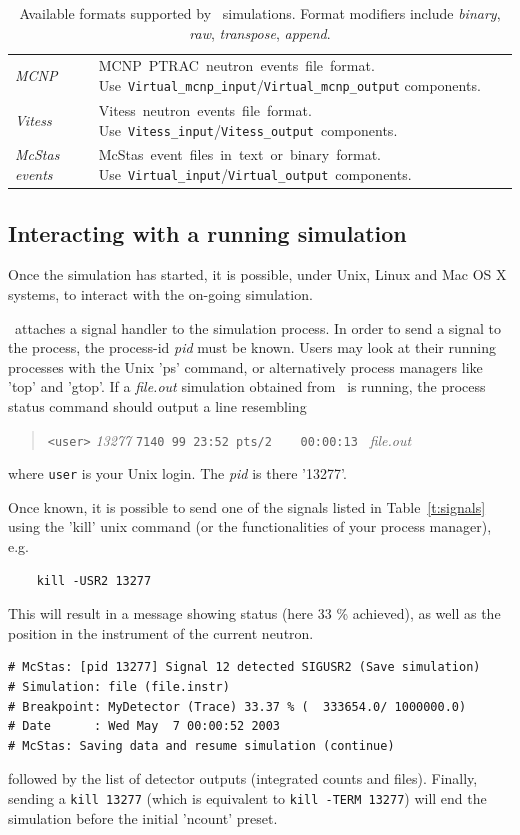 \begin{table}
\begin{center}
{\begin{tabular}{|p{}|c|p{}|}
      {\it MCNP} &  & \hbox{MCNP PTRAC neutron events file format.} \hbox{Use
        \verb+Virtual_mcnp_input+/\verb+Virtual_mcnp_output+} components. \index{MCNP}\\
      {\it Vitess} &  & \hbox{Vitess neutron events file format.} \hbox{Use \verb+Vitess_input+/\verb+Vitess_output+ components. } \index{Vitess}\\
      {\it McStas events} & & \hbox{McStas event files in text or binary
      format.} \hbox{Use \verb+Virtual_input+/\verb+Virtual_output+ components.} \\
      \hline
    \end{tabular}
    \caption{Available formats supported by \MCS\ simulations. Format modifiers include \emph{binary}, \emph{raw}, \emph{transpose}, \emph{append}.}
    \label{t:formatoptions}
    }
  \end{center}
\end{table}

\subsection{Interacting with a running simulation}

Once the simulation has started, it is possible, under Unix, Linux and Mac OS X systems, to interact with the on-going simulation.

\MCS\ attaches a signal handler to the simulation process. In order to send a signal to the process, the process-id {\it pid} must be known. Users may look at their running processes with the Unix 'ps' command, or alternatively process managers like 'top' and 'gtop'.
If a {\it file.out} simulation obtained from \MCS\ is running, the process status command should output a line resembling
\begin{quote}
  \verb|<user>| {\it 13277} \verb|7140 99 23:52 pts/2    00:00:13 | {\it file.out}\\
\end{quote}
where \verb+user+ is your Unix login. The {\it pid} is there '13277'.

Once known, it is possible to send one of the signals listed in Table~\ref{t:signals} using the 'kill' unix command (or the functionalities of your process manager), e.g.
\begin{verbatim}
    kill -USR2 13277
\end{verbatim}
This will result in a message showing status (here 33 \% achieved), as well as the position in the instrument of the current neutron.
\begin{verbatim}
# McStas: [pid 13277] Signal 12 detected SIGUSR2 (Save simulation)
# Simulation: file (file.instr)
# Breakpoint: MyDetector (Trace) 33.37 % (  333654.0/ 1000000.0)
# Date      : Wed May  7 00:00:52 2003
# McStas: Saving data and resume simulation (continue)
\end{verbatim}
followed by the list of detector outputs (integrated counts and files). Finally, sending a \verb+kill 13277+ (which is equivalent to \verb+kill -TERM 13277+) will end the simulation before the initial 'ncount' preset.

